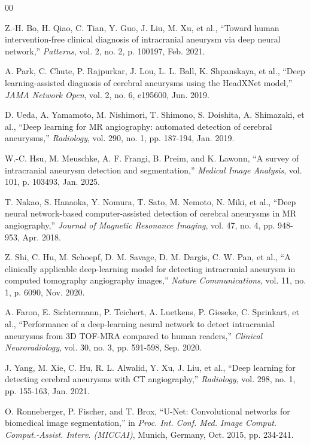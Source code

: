 \documentclass[conference]{IEEEtran}
\begin{document}

\begin{thebibliography}{00}

 Z.-H. Bo, H. Qiao, C. Tian, Y. Guo, J. Liu, M. Xu, et al., ``Toward human intervention-free clinical diagnosis of intracranial aneurysm via deep neural network,'' \textit{Patterns}, vol. 2, no. 2, p. 100197, Feb. 2021.

 A. Park, C. Chute, P. Rajpurkar, J. Lou, L. L. Ball, K. Shpanskaya, et al., ``Deep learning-assisted diagnosis of cerebral aneurysms using the HeadXNet model,'' \textit{JAMA Network Open}, vol. 2, no. 6, e195600, Jun. 2019.

 D. Ueda, A. Yamamoto, M. Nishimori, T. Shimono, S. Doishita, A. Shimazaki, et al., ``Deep learning for MR angiography: automated detection of cerebral aneurysms,'' \textit{Radiology}, vol. 290, no. 1, pp. 187-194, Jan. 2019.

 W.-C. Hsu, M. Meuschke, A. F. Frangi, B. Preim, and K. Lawonn, ``A survey of intracranial aneurysm detection and segmentation,'' \textit{Medical Image Analysis}, vol. 101, p. 103493, Jan. 2025.

 T. Nakao, S. Hanaoka, Y. Nomura, T. Sato, M. Nemoto, N. Miki, et al., ``Deep neural network-based computer-assisted detection of cerebral aneurysms in MR angiography,'' \textit{Journal of Magnetic Resonance Imaging}, vol. 47, no. 4, pp. 948-953, Apr. 2018.

 Z. Shi, C. Hu, M. Schoepf, D. M. Savage, D. M. Dargis, C. W. Pan, et al., ``A clinically applicable deep-learning model for detecting intracranial aneurysm in computed tomography angiography images,'' \textit{Nature Communications}, vol. 11, no. 1, p. 6090, Nov. 2020.

 A. Faron, E. Sichtermann, P. Teichert, A. Luetkens, P. Gieseke, C. Sprinkart, et al., ``Performance of a deep-learning neural network to detect intracranial aneurysms from 3D TOF-MRA compared to human readers,'' \textit{Clinical Neuroradiology}, vol. 30, no. 3, pp. 591-598, Sep. 2020.

 J. Yang, M. Xie, C. Hu, R. L. Alwalid, Y. Xu, J. Liu, et al., ``Deep learning for detecting cerebral aneurysms with CT angiography,'' \textit{Radiology}, vol. 298, no. 1, pp. 155-163, Jan. 2021.

 O. Ronneberger, P. Fischer, and T. Brox, ``U-Net: Convolutional networks for biomedical image segmentation,'' in \textit{Proc. Int. Conf. Med. Image Comput. Comput.-Assist. Interv. (MICCAI)}, Munich, Germany, Oct. 2015, pp. 234-241.


\end{thebibliography}
\end{document}
